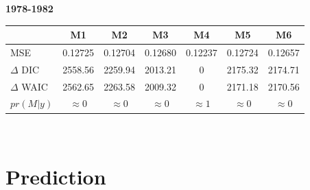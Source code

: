\documentclass[ xcolor = pdftex, dvipsnames, table ]{beamer}
\begin{document}
%
%

\begin{frame}
\begin{center}
\textbf{1978-1982}
\hspace*{-0.4cm}
\begin{tabular}[c]{@{}lcccccc@{}}
\hline
& M1 & M2 & M3 & M4 & M5 & M6 \\ \hline
MSE & 0.12725 & 0.12704 & 0.12680 & 0.12237 & 0.12724 & 0.12657 \\ %
\(\Delta\) DIC & 2558.56 & 2259.94 & 2013.21 & 0 & 2175.32 & 2174.71 \\ %
\(\Delta\) WAIC & 2562.65 & 2263.58 & 2009.32 & 0 & 2171.18 & 2170.56 \\ %
\(pr(M|y)\) & \(\approx0\) & \(\approx0\) & \(\approx0\) & \(\approx1\) & \(\approx0\) & \(\approx0\) \\ \hline
\end{tabular}

$~$\\
\end{center}
\end{frame}

%
%

%
\section{Prediction}
\end{document}
